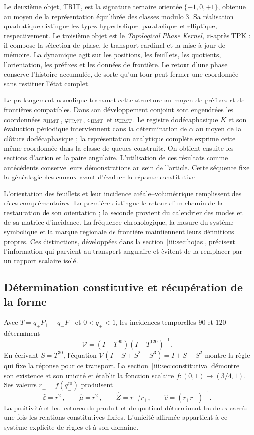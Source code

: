 Le deuxième objet, TRIT, est la signature ternaire orientée
$\{-1,0,+1\}$, obtenue au moyen de la représentation équilibrée des
classes modulo $3$. Sa réalisation quadratique distingue les types
hyperbolique, parabolique et elliptique, respectivement. Le troisième objet
est le \emph{Topological Phase Kernel}, ci-après TPK : il compose la
sélection de phase, le transport cardinal et la mise à jour de mémoire.
La dynamique agit sur les positions, les feuillets, les quotients, l’orientation,
les préfixes et les données de frontière. Le retour d’une phase conserve
l’histoire accumulée, de sorte qu’un tour peut fermer une coordonnée
sans restituer l’état complet.

Le prolongement nonadique transmet cette structure au moyen de préfixes et de
frontières compatibles. Dans son développement conjoint sont engendrées les
coordonnées $\pi_{\rm HMT}$, $\varphi_{\rm HMT}$,
$e_{\rm HMT}$ et $\alpha_{\rm HMT}$. Le registre dodécaphasique $K$
et son évaluation périodique interviennent dans la détermination de
$\alpha$ au moyen de la clôture dodécaphasique ; la représentation analytique complète exprime cette même
coordonnée dans la classe de queues construite. On obtient ensuite
les sections d’action et la paire angulaire. L’utilisation de ces résultats
comme antécédents conserve leurs démonstrations au sein de l’article.
Cette séquence fixe la généalogie des canaux avant d’évaluer la
réponse constitutive.

L’orientation des feuillets et leur incidence aréale--volumétrique remplissent
des rôles complémentaires. La première distingue le retour d’un chemin
de la restauration de son orientation ; la seconde provient du calendrier
des modes et de sa matrice d’incidence. La fréquence chronologique, la
mesure du système symbolique et la marque régionale de frontière maintiennent
leurs définitions propres. Ces distinctions, développées dans la
section~\ref{iii:sec:hojas}, précisent l’information qui parvient au
transport angulaire et évitent de la remplacer par un rapport scalaire isolé.

\clearpage
\subsection{Détermination constitutive et récupération de la forme}

Avec $T=q_+P_++q_-P_-$ et $0<q_\pm<1$, les incidences temporelles
$90$ et $120$ déterminent
\[
\mathcal V=(I-T^{90})(I-T^{120})^{-1}.
\]
En écrivant $S=T^{30}$, l’équation
$\mathcal V(I+S+S^2+S^3)=I+S+S^2$ montre la règle qui fixe la
réponse pour ce transport. La section~\ref{iii:sec:constitutiva}
démontre son existence et son unicité et établit la fonction scalaire
$f:(0,1)\to(3/4,1)$. Ses valeurs $r_\pm=f(q_\pm^{30})$
produisent
\[
\widehat\varepsilon=r_+^2,\qquad
\widehat\mu=r_-^2,\qquad
\widehat Z=r_-/r_+,\qquad
\widehat c=(r_+r_-)^{-1}.
\]
La positivité et les lectures de produit et de quotient déterminent les deux
carrés une fois les relations constitutives fixées. L’unicité
affirmée appartient à ce système explicite de règles et à son domaine.

